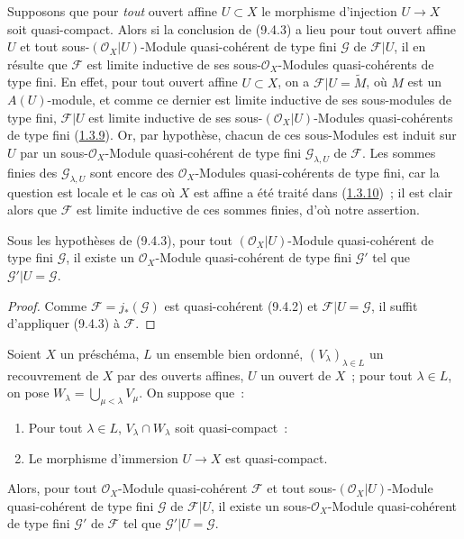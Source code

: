 \begin{remark}[9.4.4]
\label{I.9.4.4-fr}
Supposons que pour \emph{tout} ouvert affine $U\subset X$ le morphisme
d'injection $U\to X$ soit quasi-compact. Alors si la conclusion de (9.4.3) a
lieu pour tout ouvert affine $U$ et tout sous-$(\mathscr{O}_X|U)$-Module
quasi-cohérent de type fini $\mathscr{G}$ de $\mathscr{F}|U$,
il en résulte que $\mathscr{F}$ est limite inductive de ses
sous-$\mathscr{O}_X$-Modules quasi-cohérents de type fini. En effet, pour
tout ouvert affine $U\subset X$, on a $\mathscr{F}|U=\widetilde{M}$, où $M$
est un $A(U)$-module, et comme ce dernier est limite inductive de ses
sous-modules de type fini, $\mathscr{F}|U$ est limite inductive de ses
sous-$(\mathscr{O}_X|U)$-Modules quasi-cohérents de type fini
(\hyperref[I.1.3.9-fr]{1.3.9}). Or, par hypothèse, chacun de ces sous-Modules
est induit sur $U$ par un sous-$\mathscr{O}_X$-Module quasi-cohérent de type
fini $\mathscr{G}_{\lambda,U}$ de $\mathscr{F}$. Les sommes finies des
$\mathscr{G}_{\lambda,U}$ sont encore des $\mathscr{O}_X$-Modules
quasi-cohérents de type fini, car la question est locale et le cas où $X$
est affine a été traité dans (\hyperref[I.1.3.10-fr]{1.3.10})~; il est clair
alors que $\mathscr{F}$ est limite inductive de ces sommes finies, d'où notre
assertion.
\end{remark}

\begin{corollary}[9.4.5]
\label{I.9.4.5-fr}
Sous les hypothèses de (9.4.3), pour tout $(\mathscr{O}_X|U)$-Module
quasi-cohérent de type fini $\mathscr{G}$, il existe un
$\mathscr{O}_X$-Module quasi-cohérent de type fini $\mathscr{G}'$ tel que
$\mathscr{G}'|U=\mathscr{G}$.
\end{corollary}

\begin{proof}
Comme $\mathscr{F}=j_*(\mathscr{G})$ est quasi-cohérent (9.4.2) et
$\mathscr{F}|U=\mathscr{G}$, il suffit d'appliquer (9.4.3) à $\mathscr{F}$.
\end{proof}

\begin{lemma}[9.4.6]
\label{I.9.4.6-fr}
Soient $X$ un préschéma, $L$ un ensemble bien ordonné,
$(V_\lambda)_{\lambda\in L}$ un recouvrement de $X$ par des ouverts affines,
$U$ un ouvert de $X$~; pour tout $\lambda\in L$, on pose
$W_\lambda=\bigcup_{\mu<\lambda}V_\mu$. On suppose que~:
\begin{enumerate}
  \item[\textup{1\textsuperscript{o}}] Pour tout $\lambda\in L$,
    $V_\lambda\cap W_\lambda$ soit quasi-compact~:
  \item[\textup{2\textsuperscript{o}}] Le morphisme d'immersion $U\to X$ est
    quasi-compact.
\end{enumerate}
Alors, pour tout $\mathscr{O}_X$-Module quasi-cohérent $\mathscr{F}$ et tout
sous-$(\mathscr{O}_X|U)$-Module quasi-cohérent \textup{de type fini} $\mathscr{G}$ de
$\mathscr{F}|U$, il existe un sous-$\mathscr{O}_X$-Module quasi-cohérent \textup{de
type fini} $\mathscr{G}'$ de $\mathscr{F}$ tel que
$\mathscr{G}'|U=\mathscr{G}$.
\end{lemma}

